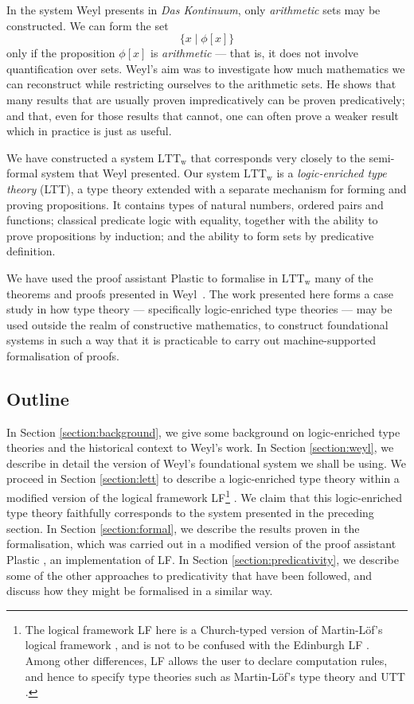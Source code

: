 \documentclass[acmtocl]{acmtrans2m}
\newcommand{\LTTW}{\ensuremath{\mathrm{LTT}_\mathrm{w}}}
\begin{document}
In the system Weyl presents in \emph{Das Kontinuum}, only \emph{arithmetic} sets may be constructed.  We can form the set
\[ \{ x \mid \phi[x] \} \]
only if the proposition $\phi[x]$ is \emph{arithmetic} --- that is, it does not involve quantification over sets.
Weyl's aim was to investigate how much mathematics we can reconstruct while restricting ourselves to the arithmetic sets.
He shows that many results that are usually proven impredicatively can be proven predicatively; and
that, even for those results that cannot, one can often prove a weaker result which in practice is just as useful.

We have constructed a system $\LTTW$ that corresponds very closely to the semi-formal system that Weyl presented.  Our system $\LTTW$ is a \emph{logic-enriched type theory} (LTT), a type theory extended with a separate mechanism for forming and proving propositions.  It contains types of natural numbers, ordered pairs and functions; classical predicate logic with equality, together with the ability to prove propositions by induction; and the ability to form sets by predicative definition.

We have used the proof assistant Plastic to formalise in $\LTTW$ many of the theorems and proofs presented in Weyl~.  The work presented here forms a case study in how type theory --- specifically logic-enriched type theories --- may be used outside the realm of constructive mathematics, to construct foundational systems in such a way that it is practicable to carry out machine-supported formalisation of proofs.






\subsection{Outline}

In Section \ref{section:background}, we give some background on logic-enriched type theories and the historical context to Weyl's work.
In Section \ref{section:weyl}, we describe in
detail the version of Weyl's foundational system we shall be using.
We proceed in Section \ref{section:lett} to describe a
logic-enriched type theory within a modified version of the logical
framework LF\footnote{The logical framework LF here is a Church-typed
version of Martin-L\"{o}f's logical framework \cite{pmltt}, and
is not to be confused with the Edinburgh LF \cite{ELF:93}.  Among other
differences, LF allows the user to declare computation rules,
and hence to specify type theories such as Martin-L\"{o}f's type theory
\cite{pmltt} and UTT \cite{luo:car}.} \cite{luo:car}.  We
claim that this logic-enriched type theory faithfully corresponds to
the system presented in the preceding section.
In Section \ref{section:formal}, we describe the results proven in the formalisation, which was carried out
in a modified version of the
proof assistant Plastic \cite{plastic}, an implementation of LF.
In Section \ref{section:predicativity}, we describe some of the other approaches to predicativity that have been followed, and discuss how they might be formalised in a similar way.
\end{document}
